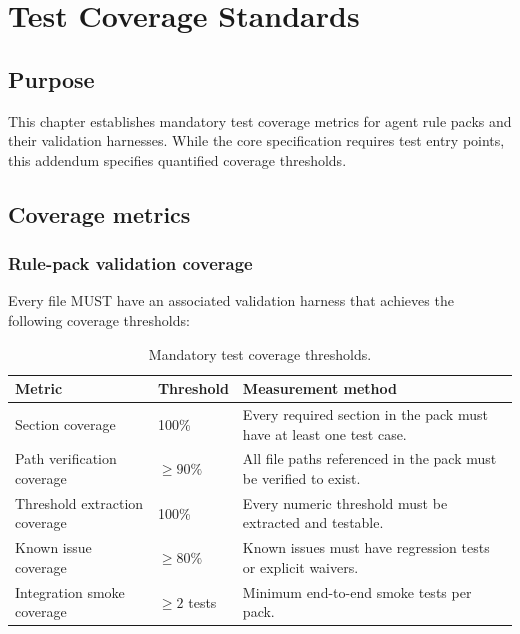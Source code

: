 \chapter{Test Coverage Standards}
\label{ch:test-coverage}

\section{Purpose}

This chapter establishes mandatory test coverage metrics for agent rule packs
and their validation harnesses. While the core specification requires test
entry points, this addendum specifies quantified coverage thresholds.

\section{Coverage metrics}

\subsection{Rule-pack validation coverage}

Every  file MUST have an associated validation harness
that achieves the following coverage thresholds:

\begin{table}[htbp]
\centering
\footnotesize
\caption{Mandatory test coverage thresholds.}
\label{tab:coverage-thresholds}
\begin{tabularx}{\textwidth}{@{}l l X@{}}
\toprule
\textbf{Metric} & \textbf{Threshold} & \textbf{Measurement method} \\
\midrule
Section coverage & 100\% & Every required section in the pack must have at least one test case. \\
Path verification coverage & $\ge 90\%$ & All file paths referenced in the pack must be verified to exist. \\
Threshold extraction coverage & 100\% & Every numeric threshold must be extracted and testable. \\
Known issue coverage & $\ge 80\%$ & Known issues must have regression tests or explicit waivers. \\
Integration smoke coverage & $\ge 2$ tests & Minimum end-to-end smoke tests per pack. \\
\bottomrule
\end{tabularx}
\end{table}

